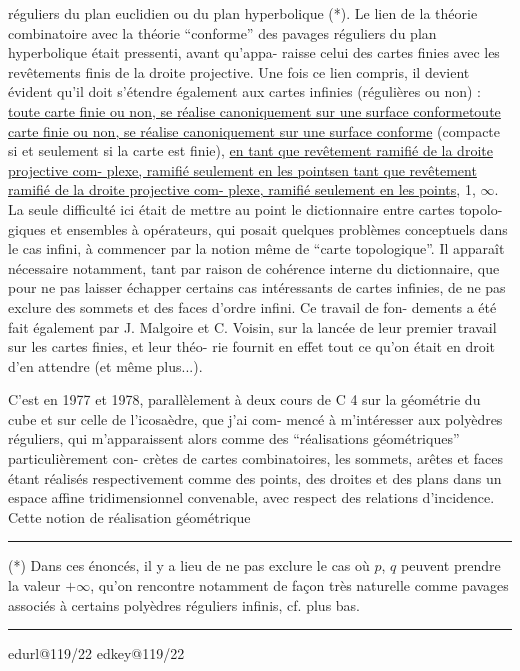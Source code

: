 \documentclass[11pt,a4paper]{article}
\makeatletter
\newif\ifreading
\newif\ifenglish
\def\CurrentScanURL{}
\def\CurrentPageKey{}
\def\CurrentApparatus{}
\newcommand{\scanpage}[1]{%
  \clearpage
  \expandafter\let\expandafter\CurrentScanURL\csname edurl@#1\endcsname
  \expandafter\let\expandafter\CurrentPageKey\csname edkey@#1\endcsname
  \def\CurrentApparatus{}%
  \hypertarget{scan-\CurrentPageKey}{}%
  \typeout{EDITION-SCAN: \CurrentPageKey; PDFPAGE: \the\numexpr\ReadonlyShipoutCounter+1\relax}%
  \ifreading
    \marginnote{\raggedright\scriptsize\sffamily\href{\CurrentScanURL}{119 / \csname edpage@#1\endcsname}}%
  \else
    \noindent{\small\sffamily\href{\CurrentScanURL}{[scan #1]}}\par\smallskip
  \fi}
\newcommand{\mspage}[1]{%
  \ifreading\marginnote{\raggedright\scriptsize\sffamily p.\,#1}[2\baselineskip]%
  \else\noindent{\small\sffamily[p.\,#1]}\par\smallskip\fi}
\let\TextUline\uline
\renewcommand{\uline}[1]{\ifmmode\underline{#1}\else\TextUline{#1}\fi}
\newcommand{\margin}[1]{%
  \sbox{\MarginalTestBox}{\parbox{\marginparwidth}{\raggedright\footnotesize#1}}%
  \ifdim\dimexpr\ht\MarginalTestBox+\dp\MarginalTestBox\relax>3\baselineskip
    \par\smallskip\noindent\begin{minipage}{\linewidth}\hrule\smallskip
    {\footnotesize\textcolor{HandInk}{\ifenglish Marginal note:\else Note marginale :\fi\ #1}}\smallskip\hrule\end{minipage}\par\smallskip
  \else
    \marginnote{\raggedright\footnotesize\textcolor{HandInk}{#1}}%
  \fi}
\newcommand{\finishscan}{\ifx\CurrentApparatus\empty\else\par\bigskip\noindent\rule{.35\linewidth}{.35pt}\par\smallskip{\footnotesize\setlength{\parskip}{3pt}\CurrentApparatus}\fi}
\makeatother
\begin{document}
réguliers du plan euclidien ou du plan hyperbolique (*). Le lien
de la théorie combinatoire avec la théorie ``conforme'' des pavages
réguliers du plan hyperbolique était pressenti, avant qu'appa-%
raisse celui des cartes finies avec les revêtements finis de la
droite projective. Une fois ce lien compris, il devient évident
qu'il doit s'étendre également aux cartes infinies (régulières
ou non) : \uline{toute carte finie ou non, se réalise canoniquement sur
une surface conforme} (compacte si et seulement si la carte est
finie), \uline{en tant que revêtement ramifié de la droite projective com-%
plexe, ramifié seulement en les points} 0, 1, $\infty$. La seule difficulté
ici était de mettre au point le dictionnaire entre cartes topolo-%
giques et ensembles à opérateurs, qui posait quelques problèmes
conceptuels dans le cas infini, à commencer par la notion même de
``carte topologique''. Il apparaît nécessaire notamment, tant par
raison de cohérence interne du dictionnaire, que pour ne pas laisser
échapper certains cas intéressants de cartes infinies, de ne pas
exclure des sommets et des faces d'ordre infini. Ce travail de fon-%
dements a été fait également par J. Malgoire et C. Voisin, sur la
lancée de leur premier travail sur les cartes finies, et leur théo-%
rie fournit en effet tout ce qu'on était en droit d'en attendre
(et même plus...).

C'est en 1977 et 1978, parallèlement à deux cours de C 4
sur la géométrie du cube et sur celle de l'icosaèdre, que j'ai com-%
mencé à m'intéresser aux polyèdres réguliers, qui m'apparaissent
alors comme des ``réalisations géométriques'' particulièrement con-%
crètes de cartes combinatoires, les sommets, arêtes et faces étant
réalisés respectivement comme des points, des droites et des plans
dans un espace affine tridimensionnel convenable, avec respect des
relations d'incidence. Cette notion de réalisation géométrique

\rule{4cm}{0.4pt}

(*) Dans ces énoncés, il y a lieu de ne pas exclure le cas où $p$, $q$
peuvent prendre la valeur $+\infty$, qu'on rencontre notamment de façon
très naturelle comme pavages associés à certains polyèdres réguliers
infinis, cf. plus bas.

\margin{21}

\finishscan
\scanpage{119/22}
\mspage{20}
\end{document}
